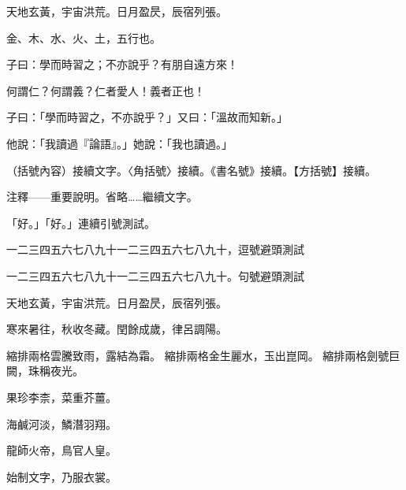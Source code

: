 \documentclass{ltc-tw-vbook}
\begin{document}
\begin{正文}

天地玄黃，宇宙洪荒。日月盈昃，辰宿列張。

金、木、水、火、土，五行也。

子曰：學而時習之；不亦說乎？有朋自遠方來！

何謂仁？何謂義？仁者愛人！義者正也！

子曰：「學而時習之，不亦說乎？」又曰：「溫故而知新。」

他說：「我讀過『論語』。」她說：「我也讀過。」

（括號內容）接續文字。〈角括號〉接續。《書名號》接續。【方括號】接續。

注釋——重要說明。省略……繼續文字。

「好。」「好。」連續引號測試。

一二三四五六七八九十一二三四五六七八九十，逗號避頭測試

一二三四五六七八九十一二三四五六七八九十。句號避頭測試

\end{正文}

\newpage

\begin{正文}

天地玄黃，宇宙洪荒。日月盈昃，辰宿列張。

\begin{段落}[indent=2]
寒來暑往，秋收冬藏。閏餘成歲，律呂調陽。
\end{段落}

\begin{段落}[indent=2]
縮排兩格 雲騰致雨，露結為霜。
縮排兩格 金生麗水，玉出崑岡。
縮排兩格 劍號巨闕，珠稱夜光。
\end{段落}

果珍李柰， 菜重芥薑。

海鹹河淡， 鱗潛羽翔。

龍師火帝，鳥官人皇。

始制 文字，乃服衣裳。

\end{正文}
\end{document}
